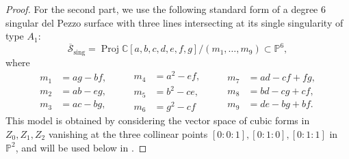 \documentclass[a4paper,reqno]{amsart}
\numberwithin{equation}{section}
\newcommand{\C}{\mathbb{C}}
\newcommand{\p}{\mathbb{P}}
\DeclareMathOperator{\Proj}{Proj}
\numberwithin{equation}{section}
\begin{document}
\begin{proof}
    For the second part, we use the following standard form of a degree 6 singular del Pezzo surface with three lines intersecting at its single singularity of type $A_1$:
    \begin{equation} \label{eq:standardmodeldepPezzoPIIsing}
        \overline{\mathcal{S}}_{\operatorname{sing}} =\Proj \C[a,b,c,d,e,f,g] / (m_1,\dots,m_9)\subset \p^6,
    \end{equation}
    where 
    \begin{equation*}
        \begin{aligned}
        m_1 &= a g - b f, \\
        m_2 &= a b -e g, \\
        m_3 &= a c -b g , 
        \end{aligned}
        \qquad
        \begin{aligned}
            m_4 &= a^2- e f , \\
        m_5 &= b^2-c  e, \\
        m_6 &= g^2 - c f
        \end{aligned}
        \qquad 
        \begin{aligned}
        m_7 &= a d - c f +  f g  , \\
        m_8 &= b d - c g  +  c f, \\
        m_9 &= d e - b g  +  b f  .
        \end{aligned}
    \end{equation*}
This model is obtained by considering the vector space of cubic forms in $Z_0,Z_1,Z_2$ vanishing at the three collinear points $[0:0:1], [0:1:0],[0:1:1]$ in $\p^2$, and will be used below in  .


\end{proof}
\end{document}
